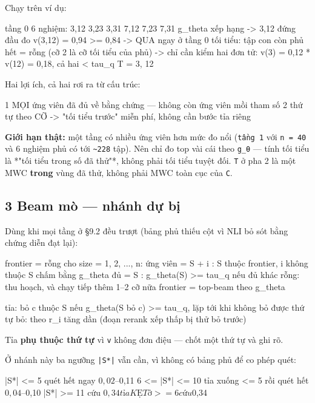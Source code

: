 \documentclass[11pt,a4paper]{article}
\begin{document}
Chạy trên ví dụ:

\begin{dia}
tầng 0   6 nghiệm: {3,12} {3,23} {3,31} {7,12} {7,23} {7,31}
         g_theta xếp hạng -> {3,12} đứng đầu
         đo v({3,12}) = 0,94 >= 0,84   ->  QUA ngay ở tầng 0
         tối tiểu: tập con còn phủ hết = rỗng (cỡ 2 là cỡ tối tiểu của phủ)
                   -> chỉ cần kiểm hai đơn tử: v({3}) = 0,12 * v({12}) = 0,18, cả hai < tau_q
         T = {3, 12}
\end{dia}

Hai lợi ích, cả hai rơi ra từ cấu trúc:

\begin{dia}
1  MỌI ứng viên đã đủ về bằng chứng — không còn ứng viên mồi tham số
2  thứ tự theo CỠ -> "tối tiểu trước" miễn phí, không cần bước tỉa riêng
\end{dia}

\textbf{Giới hạn thật:} một tầng có nhiều ứng viên hơn mức đo nổi (\texttt{tầng 1} với \texttt{n = 40} và 6 nghiệm
phủ có tới \texttt{\textasciitilde{}228} tập). Nên chỉ đo top vài cái theo \texttt{g\_θ} — tính tối tiểu là *"tối tiểu trong
số đã thử"*, không phải tối tiểu tuyệt đối. \texttt{T} ở pha 2 là một MWC \textbf{trong} vùng đã thử, không
phải MWC toàn cục của \texttt{C}.

\subsection{3 Beam mò — nhánh dự bị}

Dùng khi mọi tầng ở \S{}9.2 đều trượt (bảng phủ thiếu cột vì NLI bỏ sót bằng chứng diễn đạt lại):

\begin{dia}
frontier = { rỗng }
cho size = 1, 2, ..., n:
    ứng viên = { S + {i} : S thuộc frontier, i không thuộc S }
    chấm bằng g_theta
    đủ = { S : g_theta(S) >= tau_q }
    nếu đủ khác rỗng:  thu hoạch, và chạy tiếp thêm 1–2 cỡ nữa
    frontier = top-beam theo g_theta

tỉa:  bỏ c thuộc S nếu g_theta(S bỏ {c}) >= tau_q, lặp tới khi không bỏ được
      thứ tự bỏ: theo r_i tăng dần (đoạn rerank xếp thấp bị thử bỏ trước)
\end{dia}

Tỉa \textbf{phụ thuộc thứ tự} vì \texttt{v} không đơn điệu — chốt một thứ tự và ghi rõ.

Ở nhánh này ba ngưỡng \texttt{|S*|} vẫn cần, vì không có bảng phủ để co phép quét:

\begin{dia}
|S*| <= 5         quét hết ngay                        $0,02 – $0,11
6 <= |S*| <= 10    tỉa xuống <= 5 rồi quét hết           $0,04 – $0,10
|S*| >= 11        cứu                                  $0,34
tỉa KẸT ở >= 6    cứu                                  $0,34
\end{dia}
\end{document}
